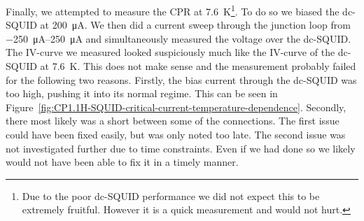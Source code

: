 Finally, we attempted to measure the CPR at \qty{7.6}{\kelvin}\footnote{Due to the poor dc-SQUID performance we did not expect this to be extremely fruitful. However it is a quick measurement and would not hurt.}. To do so we biased the dc-SQUID at \qty{200}{\micro\ampere}. We then did a current sweep through the junction loop from \qtyrange{-250}{250}{\micro\ampere} and simultaneously measured the voltage over the dc-SQUID. The IV-curve we measured looked suspiciously much like the IV-curve of the dc-SQUID at \qty{7.6}{\kelvin}. This does not make sense and the measurement probably failed for the following two reasons. Firstly, the bias current through the dc-SQUID was too high, pushing it into its normal regime. This can be seen in Figure~\ref{fig:CP1.1H-SQUID-critical-current-temperature-dependence}. Secondly, there most likely was a short between some of the connections. The first issue could have been fixed easily, but was only noted too late. The second issue was not investigated further due to time constraints. Even if we had done so we likely would not have been able to fix it in a timely manner.